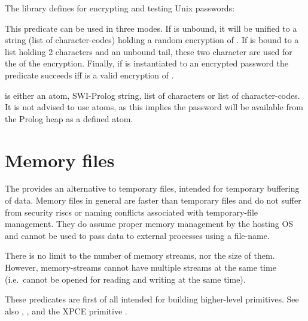 \documentclass[11pt]{article}
\begin{document}
The  library defines  for encrypting and testing
Unix passwords:

\begin{description}
This predicate can be used in three modes.  If  is
unbound, it will be unified to a string (list of character-codes)
holding a random encryption of .  If 
is bound to a list holding 2 characters and an unbound tail, these
two character are used for the  of the encryption. Finally,
if  is instantiated to an encrypted password the
predicate succeeds iff  is a valid encryption of
.

 is either an atom, SWI-Prolog string, list of characters
or list of character-codes.  It is not advised to use atoms, as this
implies the password will be available from the Prolog heap as a
defined atom.
\end{description}

\section{Memory files}

The  provides an alternative to temporary files, intended
for temporary buffering of data. Memory files in general are faster than
temporary files and do not suffer from security riscs or naming
conflicts associated with temporary-file management.  They do
assume proper memory management by the hosting OS and cannot be used
to pass data to external processes using a file-name.

There is no limit to the number of memory streams, nor the size of them.
However, memory-streams cannot have multiple streams at the same time
(i.e.\ cannot be opened for reading and writing at the same time).

These predicates are first of all intended for building higher-level
primitives.  See also , ,  and
the XPCE primitive .
\end{document}
